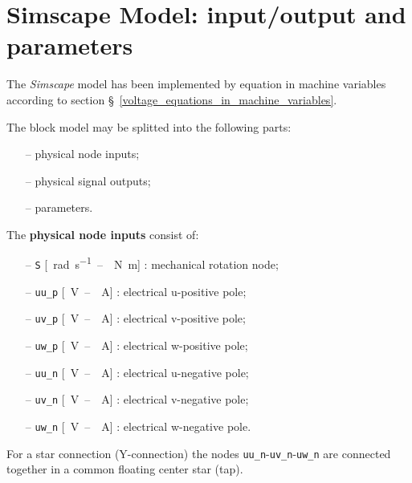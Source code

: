 \documentclass[11pt,a4paper,oneside]{book}
\numberwithin{equation}{section}
\theoremstyle{it}
\theoremstyle{definition}
\begin{document}
\section{Simscape Model: input/output and parameters}
The \textit{Simscape} model has been implemented by equation in machine variables according to section §~\ref{voltage_equations_in_machine_variables}.

The block model may be splitted into the following parts:
\begin{itemize}
	\item[--] physical node inputs;
	\item[--] physical signal outputs;
	\item[--] parameters.
\end{itemize} 

\noindent The \textbf{physical node inputs} consist of: 
\begin{itemize}
	\item[--] \texttt{S} [\SI{}{\radian\per\second}~--~\SI{}{\newton\meter}] : mechanical rotation node;
	\item[--] \texttt{uu\_p} [\SI{}{\volt}~--~\SI{}{\ampere}] : electrical u-positive pole;
	\item[--] \texttt{uv\_p} [\SI{}{\volt}~--~\SI{}{\ampere}] : electrical v-positive pole;
	\item[--] \texttt{uw\_p} [\SI{}{\volt}~--~\SI{}{\ampere}] : electrical w-positive pole;
	\item[--] \texttt{uu\_n} [\SI{}{\volt}~--~\SI{}{\ampere}] : electrical u-negative pole;
	\item[--] \texttt{uv\_n} [\SI{}{\volt}~--~\SI{}{\ampere}] : electrical v-negative pole;
	\item[--] \texttt{uw\_n} [\SI{}{\volt}~--~\SI{}{\ampere}] : electrical w-negative pole.
\end{itemize} 
For a star connection (Y-connection) the nodes \texttt{uu\_n}-\texttt{uv\_n}-\texttt{uw\_n} are connected together in a common floating center star (tap).
\end{document}
